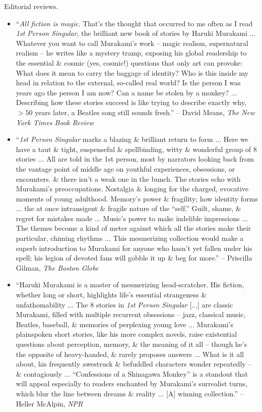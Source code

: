 \documentclass{article}
\begin{document}
\begin{enumerate}
	{\sf Editorial reviews.}
	\begin{itemize}
		\item ``{\it All fiction is magic}. That's the thought that occurred to me often as I read {\it1st Person Singular}, the brilliant new book of stories by {\sc Haruki Murakami} $\ldots$ Whatever you want to call {\sc Murakami}'s work -- magic realism, supernatural realism -- he writes like a mystery tramp, exposing his global readership to the essential \& cosmic (yes, cosmic!) questions that only art can provoke: What does it mean to carry the baggage of identity? Who is this inside my head in relation to the external, so-called real world? Is the person I was years ago the person I am now? Can a name be stolen by a monkey? $\ldots$ Describing how these stories succeed is like trying to describe exactly why, $> 50$ years later, a Beatles song still sounds fresh.'' -- {\sc David Means}, {\it The New York Times Book Review}
		\item ``{\it1st Person Singular} marks a blazing \& brilliant return to form $\ldots$ Here we have a taut \& tight, suspenseful \& spellbinding, witty \& wonderful group of 8 stories $\ldots$ All are told in the 1st person, most by narrators looking back from the vantage point of middle age on youthful experiences, obsessions, or encounters. \& there isn't a weak one in the bunch. The stories echo with {\sc Murakami}'s preoccupations. Nostalgia \& longing for the charged, evocative moments of young adulthood. Memory's power \& fragility; how identity forms $\ldots$ the at once intransigent \& fragile nature of the ``self.'' Guilt, shame, \& regret for mistakes made $\ldots$ Music's power to make indelible impressions $\ldots$ The themes become a kind of meter against which all the stories make their particular, chiming rhythms $\ldots$ This mesmerizing collection would make a superb introduction to {\sc Murakami} for anyone who hasn't yet fallen under his spell; his legion of devoted fans will gobble it up \& beg for more.'' -- {\sc Priscilla Gilman}, {\it The Boston Globe}
		\item ``{\sc Haruki Murakami} is a master of mesmerizing head-scratcher. His fiction, whether long or short, highlights life's essential strangeness \& unfathomability $\ldots$ The 8 stories in {\it1st Person Singular} [$\ldots$] are classic {\sc Murakami}, filled with multiple recurrent obsessions -- jazz, classical music, Beatles, baseball, \& memories of perplexing young love $\ldots$ {\sc Murakami}'s plainspoken short stories, like his more complex novels, raise existential questions about perception, memory, \& the meaning of it all -- though he's the opposite of heavy-handed, \& rarely proposes answers $\ldots$ What is it all about, his frequently awestruck \& befuddled characters wonder repeatedly -- \& contagiously $\ldots$ ``Confessions of a Shinagawa Monkey'' is a standout that will appeal especially to readers enchanted by {\sc Murakami}'s surrealist turns, which blur the line between dreams \& reality $\ldots$ [A] winning collection.'' -- {\sc Heller McAlpin}, {\it NPR}

\end{itemize}
\end{enumerate}
\end{document}
